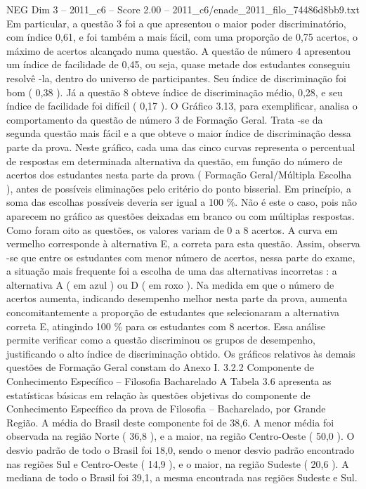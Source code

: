 \begin{textsample}{NEG Dim 3 – 2011\_c6 – Score 2.00 – 2011\_c6/enade\_2011\_filo\_74486d8bb9.txt}
Em particular, a questão 3 foi a que apresentou o maior poder discriminatório, com índice 0,61, e foi também a mais fácil, com uma proporção de 0,75 acertos, o máximo de acertos alcançado numa questão.
A questão de número 4 apresentou um índice de facilidade de 0,45, ou seja, quase metade dos estudantes conseguiu resolvê -la, dentro do universo de participantes.
Seu índice de discriminação foi bom ( 0,38 ).
Já a questão 8 obteve índice de discriminação médio, 0,28, e seu índice de facilidade foi difícil ( 0,17 ).
O Gráfico 3.13, para exemplificar, analisa o comportamento da questão de número 3 de Formação Geral.
Trata -se da segunda questão mais fácil e a que obteve o maior índice de discriminação dessa parte da prova.
Neste gráfico, cada uma das cinco curvas representa o percentual de respostas em determinada alternativa da questão, em função do número de acertos dos estudantes nesta parte da prova ( Formação Geral/Múltipla Escolha ), antes de possíveis eliminações pelo critério do ponto bisserial.
Em princípio, a soma das escolhas possíveis deveria ser igual a 100 \%.
Não é este o caso, pois não aparecem no gráfico as questões deixadas em branco ou com múltiplas respostas.
Como foram oito as questões, os valores variam de 0 a 8 acertos.
A curva em vermelho corresponde à alternativa E, a correta para esta questão.
Assim, observa -se que entre os estudantes com menor número de acertos, nessa parte do exame, a situação mais frequente foi a escolha de uma das alternativas incorretas : a alternativa A ( em azul ) ou D ( em roxo ).
Na medida em que o número de acertos aumenta, indicando desempenho melhor nesta parte da prova, aumenta concomitantemente a proporção de estudantes que selecionaram a alternativa correta E, atingindo 100 \% para os estudantes com 8 acertos.
Essa análise permite verificar como a questão discriminou os grupos de desempenho, justificando o alto índice de discriminação obtido.
Os gráficos relativos às demais questões de Formação Geral constam do Anexo I. 3.2.2 Componente de Conhecimento Específico – Filosofia Bacharelado A Tabela 3.6 apresenta as estatísticas básicas em relação às questões objetivas do componente de Conhecimento Específico da prova de Filosofia – Bacharelado, por Grande Região.
A média do Brasil deste componente foi de 38,6.
A menor média foi observada na região Norte ( 36,8 ), e a maior, na região Centro-Oeste ( 50,0 ).
O desvio padrão de todo o Brasil foi 18,0, sendo o menor desvio padrão encontrado nas regiões Sul e Centro-Oeste ( 14,9 ), e o maior, na região Sudeste ( 20,6 ).
A mediana de todo o Brasil foi 39,1, a mesma encontrada nas regiões Sudeste e Sul.

\end{textsample}
